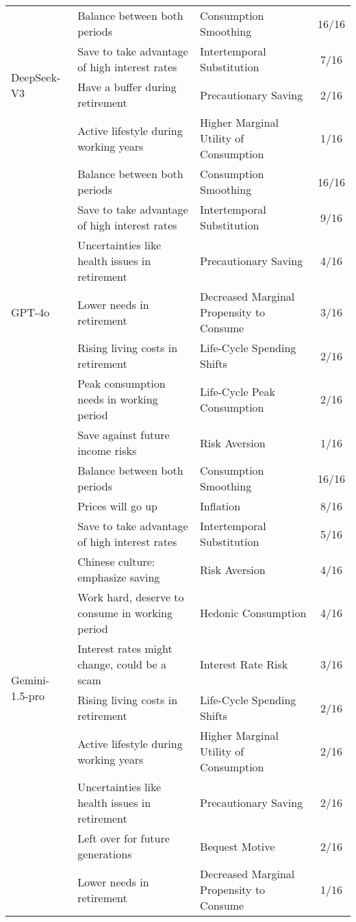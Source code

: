 \documentclass[12pt]{article}
\begin{document}
\begin{CJK*}{UTF8}{gbsn}
\begin{longtable}{p{2cm}p{6cm}p{4cm}c}
\multirow{4}{=}{DeepSeek-V3} 
 & Balance between both periods & Consumption Smoothing & 16/16 \\
 & Save to take advantage of high interest rates & Intertemporal Substitution & 7/16 \\
 & Have a buffer during retirement & Precautionary Saving & 2/16 \\
 & Active lifestyle during working years & Higher Marginal Utility of Consumption & 1/16 \\
\hline
\multirow{7}{=}{GPT-4o} 
 & Balance between both periods & Consumption Smoothing & 16/16 \\
 & Save to take advantage of high interest rates & Intertemporal Substitution & 9/16 \\
 & Uncertainties like health issues in retirement & Precautionary Saving & 4/16 \\
 & Lower needs in retirement & Decreased Marginal Propensity to Consume & 3/16 \\
 & Rising living costs in retirement & Life-Cycle Spending Shifts & 2/16 \\
 & Peak consumption needs in working period & Life-Cycle Peak Consumption & 2/16 \\
 & Save against future income risks & Risk Aversion & 1/16 \\
\hline
\multirow{12}{=}{Gemini-1.5-pro}
 & Balance between both periods & Consumption Smoothing & 16/16 \\
 & Prices will go up & Inflation & 8/16 \\
 & Save to take advantage of high interest rates & Intertemporal Substitution & 5/16 \\
 & Chinese culture: emphasize saving & Risk Aversion & 4/16 \\
 & Work hard, deserve to consume in working period & Hedonic Consumption & 4/16 \\
 & Interest rates might change, could be a scam & Interest Rate Risk & 3/16 \\
 & Rising living costs in retirement & Life-Cycle Spending Shifts & 2/16 \\
 & Active lifestyle during working years & Higher Marginal Utility of Consumption & 2/16 \\
 & Uncertainties like health issues in retirement & Precautionary Saving & 2/16 \\
 & Left over for future generations & Bequest Motive & 2/16 \\
 & Lower needs in retirement & Decreased Marginal Propensity to Consume & 1/16 \\

\end{longtable}
\end{CJK*}
\end{document}

